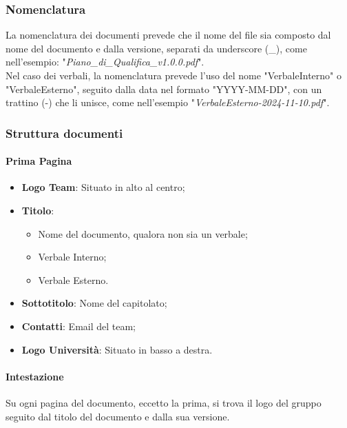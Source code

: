 \documentclass[10pt]{article}
\begin{document}
\begin{justify}
    \subsubsection{Nomenclatura}
    La nomenclatura dei documenti prevede che il nome del file sia composto dal nome del documento e dalla versione, separati da underscore (\_), come nell'esempio: "\textit{Piano\_di\_Qualifica\_v1.0.0.pdf}".\\
    Nel caso dei verbali, la nomenclatura prevede l'uso del nome "VerbaleInterno" o "VerbaleEsterno", seguito dalla data nel formato "YYYY-MM-DD", con un trattino (-) che li unisce, come nell'esempio "\textit{VerbaleEsterno-2024-11-10.pdf}".\\

    \subsubsection{Struttura documenti}

        \paragraph{Prima Pagina}
        \begin{itemize}
            \item \textbf{Logo Team}: Situato in alto al centro;
            \item \textbf{Titolo}: \begin{itemize}
            \item Nome del documento, qualora non sia un verbale;
            \item Verbale Interno;
            \item Verbale Esterno.
            \end{itemize}
            \item\textbf{Sottotitolo}: Nome del capitolato;
            \item\textbf{Contatti}: Email del team;
            \item\textbf{Logo Università}: Situato in basso a destra.
        \end{itemize}

        \paragraph{Intestazione}
        Su ogni pagina del documento, eccetto la prima, si trova il logo del gruppo seguito dal titolo del documento e dalla sua versione.\\


\end{justify}
\end{document}
